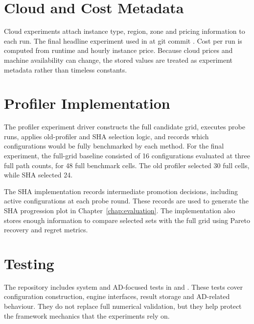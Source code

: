 \section{Cloud and Cost Metadata}

Cloud experiments attach instance type, region, zone and pricing information to each run. The final headline experiment used  in  at git commit . Cost per run is computed from runtime and hourly instance price. Because cloud prices and machine availability can change, the stored values are treated as experiment metadata rather than timeless constants.

\section{Profiler Implementation}

The profiler experiment driver constructs the full candidate grid, executes probe runs, applies old-profiler and SHA selection logic, and records which configurations would be fully benchmarked by each method. For the final experiment, the full-grid baseline consisted of 16 configurations evaluated at three full path counts, for 48 full benchmark cells. The old profiler selected 30 full cells, while SHA selected 24.

The SHA implementation records intermediate promotion decisions, including active configurations at each probe round. These records are used to generate the SHA progression plot in Chapter~\ref{chap:evaluation}. The implementation also stores enough information to compare selected sets with the full grid using Pareto recovery and regret metrics.

\section{Testing}

The repository includes system and AD-focused tests in  and . These tests cover configuration construction, engine interfaces, result storage and AD-related behaviour. They do not replace full numerical validation, but they help protect the framework mechanics that the experiments rely on.
